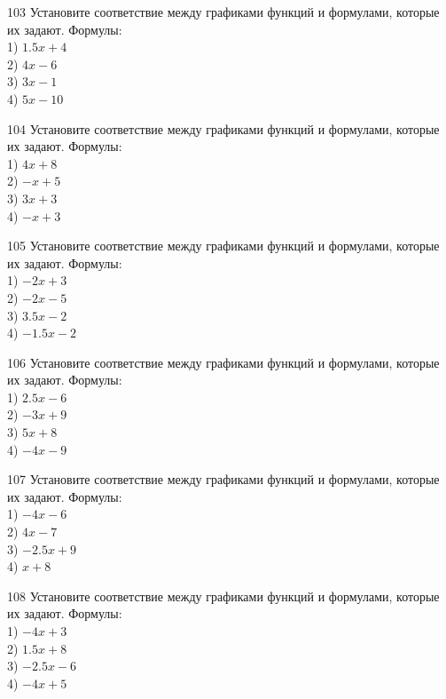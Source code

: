 \documentclass[4apaper]{article}
\begin{document}
\begin{taskBN}{103}
Установите соответствие между графиками функций и формулами, которые их задают. Формулы: \\1) $1.5x+4$\\2) $4x-6$\\3) $3x-1$\\4) $5x-10$
\end{taskBN}

\begin{taskBN}{104}
Установите соответствие между графиками функций и формулами, которые их задают. Формулы: \\1) $4x+8$\\2) $-x+5$\\3) $3x+3$\\4) $-x+3$
\end{taskBN}

\begin{taskBN}{105}
Установите соответствие между графиками функций и формулами, которые их задают. Формулы: \\1) $-2x+3$\\2) $-2x-5$\\3) $3.5x-2$\\4) $-1.5x-2$
\end{taskBN}

\begin{taskBN}{106}
Установите соответствие между графиками функций и формулами, которые их задают. Формулы: \\1) $2.5x-6$\\2) $-3x+9$\\3) $5x+8$\\4) $-4x-9$
\end{taskBN}

\begin{taskBN}{107}
Установите соответствие между графиками функций и формулами, которые их задают. Формулы: \\1) $-4x-6$\\2) $4x-7$\\3) $-2.5x+9$\\4) $x+8$
\end{taskBN}

\begin{taskBN}{108}
Установите соответствие между графиками функций и формулами, которые их задают. Формулы: \\1) $-4x+3$\\2) $1.5x+8$\\3) $-2.5x-6$\\4) $-4x+5$
\end{taskBN}
\end{document}
